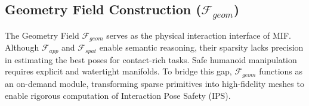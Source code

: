 \documentclass[conference]{IEEEtran}
\begin{document}



\subsection{Geometry Field Construction ($\mathcal{F}_{geom}$)}
\label{sec:geometry_field}

The Geometry Field $\mathcal{F}_{geom}$ serves as the physical interaction interface of MIF. Although $\mathcal{F}_{app}$ and $\mathcal{F}_{spat}$ enable semantic reasoning, their sparsity lacks precision in estimating the best poses for contact-rich tasks. Safe humanoid manipulation requires explicit and watertight manifolds. To bridge this gap, $\mathcal{F}_{geom}$ functions as an on-demand module, transforming sparse primitives into high-fidelity meshes to enable rigorous computation of Interaction Pose Safety (IPS).
\end{document}
